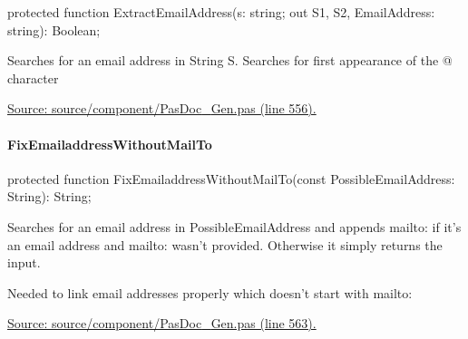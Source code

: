 \documentclass{report}
\newif\ifpdf
\begin{document}
\label{PasDoc_Gen.TDocGenerator-ExtractEmailAddress}
\begin{list}{}{
\setlength{\itemindent}{0cm}
\setlength{\listparindent}{0cm}
\setlength{\leftmargin}{\evensidemargin}
\addtolength{\leftmargin}{\tmplength}
\settowidth{\labelsep}{X}
\addtolength{\leftmargin}{\labelsep}
\setlength{\labelwidth}{\tmplength}
}
\item[\textbf{Declaration}\hfill]
\ifpdf
\begin{flushleft}
\fi
\begin{ttfamily}
protected function ExtractEmailAddress(s: string; out S1, S2, EmailAddress: string): Boolean;\end{ttfamily}

\ifpdf
\end{flushleft}
\fi

\par
\item[\textbf{Description}]
Searches for an email address in String S. Searches for first appearance of the @ character\par
\href{https://github.com/pasdoc/pasdoc/blob/master/source/component/PasDoc_Gen.pas#L556}{Source: source/component/PasDoc{\_}Gen.pas (line 556).}

\end{list}
\paragraph*{FixEmailaddressWithoutMailTo}\hspace*{\fill}

\label{PasDoc_Gen.TDocGenerator-FixEmailaddressWithoutMailTo}
\begin{list}{}{
\setlength{\itemindent}{0cm}
\setlength{\listparindent}{0cm}
\setlength{\leftmargin}{\evensidemargin}
\addtolength{\leftmargin}{\tmplength}
\settowidth{\labelsep}{X}
\addtolength{\leftmargin}{\labelsep}
\setlength{\labelwidth}{\tmplength}
}
\item[\textbf{Declaration}\hfill]
\ifpdf
\begin{flushleft}
\fi
\begin{ttfamily}
protected function FixEmailaddressWithoutMailTo(const PossibleEmailAddress: String): String;\end{ttfamily}

\ifpdf
\end{flushleft}
\fi

\par
\item[\textbf{Description}]
Searches for an email address in PossibleEmailAddress and appends mailto: if it's an email address and mailto: wasn't provided. Otherwise it simply returns the input.

Needed to link email addresses properly which doesn't start with mailto:\par
\href{https://github.com/pasdoc/pasdoc/blob/master/source/component/PasDoc_Gen.pas#L563}{Source: source/component/PasDoc{\_}Gen.pas (line 563).}

\end{list}
\end{document}
